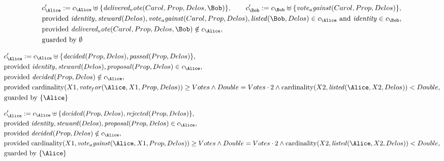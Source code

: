 \begin{align*}
&
c'_
{
\Alice
}
 := 
c_
{
\Alice
}
 \uplus 
\{
\mathit{
delivered_vote
}
(
Carol
,
Prop
,
Delos
,
\Bob
)
\}
, \qquad 
c'_
{
\Bob
}
 := 
c_
{
\Bob
}
 \uplus 
\{
\mathit{
vote_against
}
(
Carol
,
Prop
,
Delos
)
\}
,\\
&
\text{provided } 
\mathit{
identity
}
,
\mathit{
steward
}
(
Delos
)
,
\mathit{
vote_against
}
(
Carol
,
Prop
,
Delos
)
,
\mathit{
listed
}
(
\Bob
,
Delos
)
 \in c_
{
\Alice
}
 \text{ and } 
\mathit{
identity
}
 \in c_
{
\Bob
}
,\\
&
\text{provided } 
\mathit{
delivered_vote
}
(
Carol
,
Prop
,
Delos
,
\Bob
)
 \notin c_
{
\Alice
}
,\\
&
\text{guarded by } \emptyset
\end{align*}

\begin{align*}
&
c'_
{
\Alice
}
 := 
c_
{
\Alice
}
 \uplus 
\{
\mathit{
decided
}
(
Prop
,
Delos
)
,
\mathit{
passed
}
(
Prop
,
Delos
)
\}
,\\
&
\text{provided } 
\mathit{
identity
}
,
\mathit{
steward
}
(
Delos
)
,
\mathit{
proposal
}
(
Prop
,
Delos
)
 \in c_
{
\Alice
}
,\\
&
\text{provided } 
\mathit{
decided
}
(
Prop
,
Delos
)
 \notin c_
{
\Alice
}
,\\
&
\text{provided } 
\mathrm{cardinality}(
X1
,
\mathit{
vote_for
}
(
\Alice
,
X1
,
Prop
,
Delos
)
)
\ge
Votes
\land
Double
=
Votes
\cdot
2
\land
\mathrm{cardinality}(
X2
,
\mathit{
listed
}
(
\Alice
,
X2
,
Delos
)
)
<
Double
,\\
&
\text{guarded by } \{
\Alice
\}
\end{align*}

\begin{align*}
&
c'_
{
\Alice
}
 := 
c_
{
\Alice
}
 \uplus 
\{
\mathit{
decided
}
(
Prop
,
Delos
)
,
\mathit{
rejected
}
(
Prop
,
Delos
)
\}
,\\
&
\text{provided } 
\mathit{
identity
}
,
\mathit{
steward
}
(
Delos
)
,
\mathit{
proposal
}
(
Prop
,
Delos
)
 \in c_
{
\Alice
}
,\\
&
\text{provided } 
\mathit{
decided
}
(
Prop
,
Delos
)
 \notin c_
{
\Alice
}
,\\
&
\text{provided } 
\mathrm{cardinality}(
X1
,
\mathit{
vote_against
}
(
\Alice
,
X1
,
Prop
,
Delos
)
)
\ge
Votes
\land
Double
=
Votes
\cdot
2
\land
\mathrm{cardinality}(
X2
,
\mathit{
listed
}
(
\Alice
,
X2
,
Delos
)
)
<
Double
,\\
&
\text{guarded by } \{
\Alice
\}
\end{align*}
